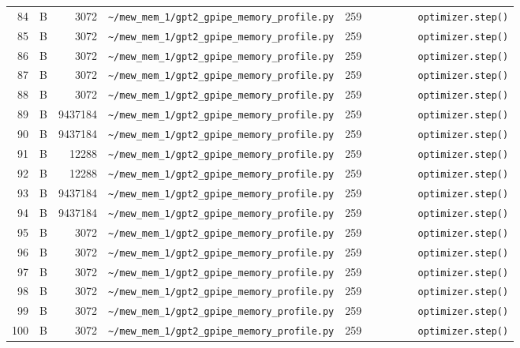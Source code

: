 \documentclass{article}
\begin{document}
\begin{longtable}{r l r p{6.5cm} r p{7.0cm}}
84 & B & 3072 & \lstinline|~/mew_mem_1/gpt2_gpipe_memory_profile.py| & 259 & \lstinline|        optimizer.step()| \\
85 & B & 3072 & \lstinline|~/mew_mem_1/gpt2_gpipe_memory_profile.py| & 259 & \lstinline|        optimizer.step()| \\
86 & B & 3072 & \lstinline|~/mew_mem_1/gpt2_gpipe_memory_profile.py| & 259 & \lstinline|        optimizer.step()| \\
87 & B & 3072 & \lstinline|~/mew_mem_1/gpt2_gpipe_memory_profile.py| & 259 & \lstinline|        optimizer.step()| \\
88 & B & 3072 & \lstinline|~/mew_mem_1/gpt2_gpipe_memory_profile.py| & 259 & \lstinline|        optimizer.step()| \\
89 & B & 9437184 & \lstinline|~/mew_mem_1/gpt2_gpipe_memory_profile.py| & 259 & \lstinline|        optimizer.step()| \\
90 & B & 9437184 & \lstinline|~/mew_mem_1/gpt2_gpipe_memory_profile.py| & 259 & \lstinline|        optimizer.step()| \\
91 & B & 12288 & \lstinline|~/mew_mem_1/gpt2_gpipe_memory_profile.py| & 259 & \lstinline|        optimizer.step()| \\
92 & B & 12288 & \lstinline|~/mew_mem_1/gpt2_gpipe_memory_profile.py| & 259 & \lstinline|        optimizer.step()| \\
93 & B & 9437184 & \lstinline|~/mew_mem_1/gpt2_gpipe_memory_profile.py| & 259 & \lstinline|        optimizer.step()| \\
94 & B & 9437184 & \lstinline|~/mew_mem_1/gpt2_gpipe_memory_profile.py| & 259 & \lstinline|        optimizer.step()| \\
95 & B & 3072 & \lstinline|~/mew_mem_1/gpt2_gpipe_memory_profile.py| & 259 & \lstinline|        optimizer.step()| \\
96 & B & 3072 & \lstinline|~/mew_mem_1/gpt2_gpipe_memory_profile.py| & 259 & \lstinline|        optimizer.step()| \\
97 & B & 3072 & \lstinline|~/mew_mem_1/gpt2_gpipe_memory_profile.py| & 259 & \lstinline|        optimizer.step()| \\
98 & B & 3072 & \lstinline|~/mew_mem_1/gpt2_gpipe_memory_profile.py| & 259 & \lstinline|        optimizer.step()| \\
99 & B & 3072 & \lstinline|~/mew_mem_1/gpt2_gpipe_memory_profile.py| & 259 & \lstinline|        optimizer.step()| \\
100 & B & 3072 & \lstinline|~/mew_mem_1/gpt2_gpipe_memory_profile.py| & 259 & \lstinline|        optimizer.step()| \\

\end{longtable}
\end{document}
